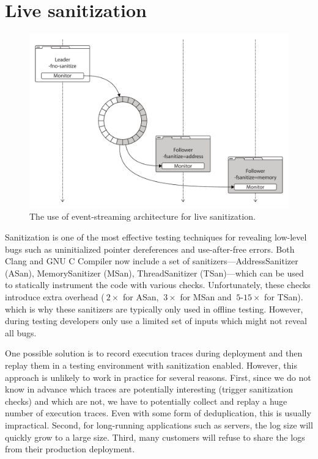 \section{Live sanitization}
\label{sec:sanitization}

\begin{figure}[t]
  \begin{center}
    \includegraphics[width=0.75\columnwidth]{applications/figures/live-sanitization}
    \caption{The use of event-streaming architecture for live sanitization.}
    \label{fig:live-sanitization}
  \end{center}
\end{figure}

Sanitization is one of the most effective testing techniques for revealing
low-level bugs such as uninitialized pointer dereferences and use-after-free
errors.  Both Clang and GNU C Compiler now include a set of
sanitizers---AddressSanitizer (ASan), MemorySanitizer (MSan), ThreadSanitizer
(TSan)---which can be used to statically instrument the code with various
checks.  Unfortunately, these checks introduce extra overhead (\eg $~2\times$
for ASan, $~3\times$ for MSan and $~5$-$15\times$ for TSan).  which is why
these sanitizers are typically only used in offline testing. However, during
testing developers only use a limited set of inputs which might not reveal all
bugs.

One possible solution is to record execution traces during deployment and then
replay them in a testing environment with sanitization enabled. However, this
approach is unlikely to work in practice for several reasons. First, since we
do not know in advance which traces are potentially interesting (\eg trigger
sanitization checks) and which are not, we have to potentially collect and
replay a huge number of execution traces. Even with some form of deduplication,
this is usually impractical. Second, for long-running applications such as
servers, the log size will quickly grow to a large size. Third, many customers
will refuse to share the logs from their production deployment.

